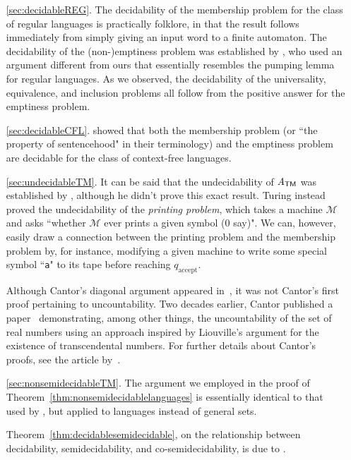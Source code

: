 

%




\begin{enumerate}
\item[\ref{sec:decidableREG}.] The decidability of the membership problem for the class of regular languages is practically folklore, in that the result follows immediately from simply giving an input word to a finite automaton. The decidability of the (non-)emptiness problem was established by \citet{Moore1956GedankenExperiments}, who used an argument different from ours that essentially resembles the pumping lemma for regular languages. As we observed, the decidability of the universality, equivalence, and inclusion problems all follow from the positive answer for the emptiness problem.

\item[\ref{sec:decidableCFL}.] \citet*{BarHillel1961FormalPropertiesPhraseStructureGrammars} showed that both the membership problem (or ``the property of sentencehood" in their terminology) and the emptiness problem are decidable for the class of context-free languages.

\item[\ref{sec:undecidableTM}.] It can be said that the undecidability of $\mathit{A}_{\textsf{TM}}$ was established by \citet{Turing1936OnComputableNumbers}, although he didn't prove this exact result. Turing instead proved the undecidability of the \emph{printing problem}, which takes a machine $\mathcal{M}$ and asks ``whether $\mathcal{M}$ ever prints a given symbol (0 say)". We can, however, easily draw a connection between the printing problem and the membership problem by, for instance, modifying a given machine to write some special symbol ``\texttt{a}" to its tape before reaching $q_{\text{accept}}$.

Although Cantor's diagonal argument appeared in~\citeyear{Cantor1891Mannigfaltigkeitslehre}, it was not Cantor's first proof pertaining to uncountability. Two decades earlier, Cantor published a paper~\citeyearpar{Cantor1874Zahlen} demonstrating, among other things, the uncountability of the set of real numbers using an approach inspired by Liouville's argument for the existence of transcendental numbers. For further details about Cantor's proofs, see the article by~\citet{Gray1994CantorTranscendental}.

\item[\ref{sec:nonsemidecidableTM}.] The argument we employed in the proof of Theorem~\ref{thm:nonsemidecidablelanguages} is essentially identical to that used by \citet{Cantor1891Mannigfaltigkeitslehre}, but applied to languages instead of general sets.

Theorem~\ref{thm:decidablesemidecidable}, on the relationship between decidability, semidecidability, and co-semidecidability, is due to \citet{Post1944RecursivelyEnumerableSets}.
\end{enumerate}